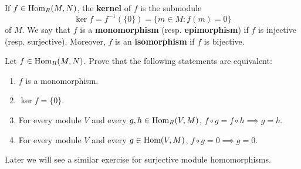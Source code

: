 If $f\in\operatorname{Hom}_R(M,N)$, the \textbf{kernel} of $f$ is the submodule  
\[
\ker f=f^{-1}(\{0\})=\{m\in M:f(m)=0\}
\]
of $M$. We say that $f$ is a \textbf{monomorphism} (resp. \textbf{epimorphism}) 
if $f$ is injective (resp. surjective). Moreover, $f$ is an \textbf{isomorphism} 
if $f$ is
bijective. 

\begin{exercise}
Let $f\in\operatorname{Hom}_R(M,N)$. Prove that the following statements are equivalent:
\begin{enumerate}
\item $f$ is a monomorphism.
\item $\ker f=\{0\}$.
\item For every module $V$ and every $g,h\in\operatorname{Hom}_R(V,M)$, $f\circ g=f\circ h\implies g=h$.
\item For every module $V$ and every $g\in\operatorname{Hom}(V,M)$, $f\circ g=0\implies g=0$.
\end{enumerate}
\end{exercise}

Later we will see a similar exercise for surjective module homomorphisms.


